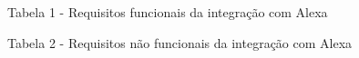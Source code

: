 \makeatletter
{}
\makeatother

\renewcommand{\baselinestretch}{1.5}\selectfont
\setlength{\parskip}{0pt}

\begin{flushleft}

Tabela 1 - Requisitos funcionais da integração com Alexa 

Tabela 2 - Requisitos não funcionais da integração com Alexa 

\end{flushleft}

\renewcommand{\baselinestretch}{1.0}\selectfont
\setlength{\parskip}{\baselineskip}

